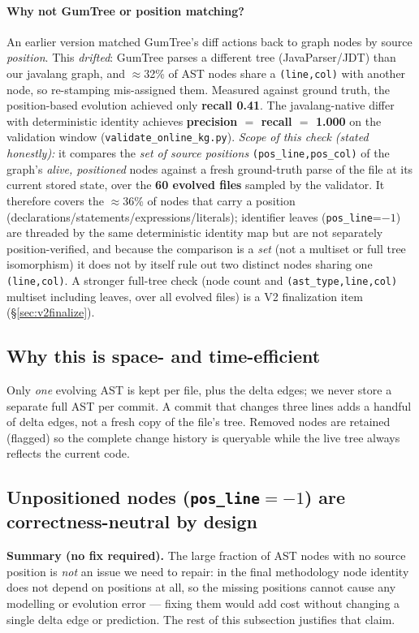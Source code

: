 \documentclass[11pt,a4paper]{article}
\newcommand{\code}[1]{\texttt{#1}}
\begin{document}
	\paragraph{Why not GumTree or position matching?} An earlier version matched
	GumTree's diff actions back to graph nodes by source \emph{position}. This
	\emph{drifted}: GumTree parses a different tree (JavaParser/JDT) than our
	javalang graph, and $\approx$32\% of AST nodes share a \texttt{(line,col)} with
	another node, so re-stamping mis-assigned them. Measured against ground truth,
	the position-based evolution achieved only \textbf{recall 0.41}. The
	javalang-native differ with deterministic identity achieves
	\textbf{precision $=$ recall $=$ 1.000} on the validation window
	(\texttt{validate\_online\_kg.py}). \emph{Scope of this check (stated honestly):}
	it compares the \emph{set of source positions} \texttt{(pos\_line,pos\_col)} of
	the graph's \emph{alive, positioned} nodes against a fresh ground-truth parse of
	the file at its current stored state, over the \textbf{60 evolved files} sampled
	by the validator. It therefore covers the $\approx$36\% of nodes that carry a
	position (declarations/statements/expressions/literals); identifier leaves
	(\code{pos\_line}=$-1$) are threaded by the same deterministic identity map but
	are not separately position-verified, and because the comparison is a
	\emph{set} (not a multiset or full tree isomorphism) it does not by itself rule
	out two distinct nodes sharing one \texttt{(line,col)}. A stronger full-tree
	check (node count and \texttt{(ast\_type,line,col)} multiset including leaves,
	over all evolved files) is a V2 finalization item (\S\ref{sec:v2finalize}).
	
	\subsection{Why this is space- and time-efficient}
	Only \emph{one} evolving AST is kept per file, plus the delta edges; we never
	store a separate full AST per commit. A commit that changes three lines adds a
	handful of delta edges, not a fresh copy of the file's tree. Removed nodes are
	retained (flagged) so the complete change history is queryable while the live
	tree always reflects the current code.

	\subsection{Unpositioned nodes (\texttt{pos\_line}$=-1$) are correctness-neutral
	by design}\label{sec:posneg}
	\textbf{Summary (no fix required).} The large fraction of AST nodes with no source
	position is \emph{not} an issue we need to repair: in the final methodology node
	identity does not depend on positions at all, so the missing positions cannot cause
	any modelling or evolution error --- fixing them would add cost without changing a
	single delta edge or prediction. The rest of this subsection justifies that claim.
\end{document}

